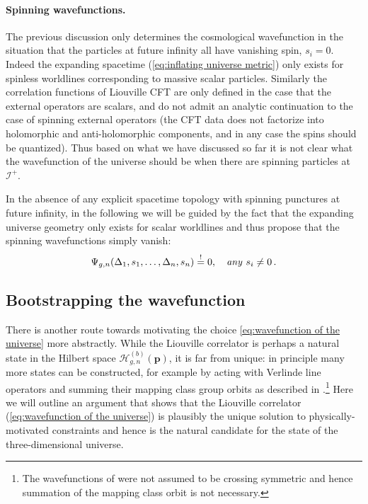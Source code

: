 \documentclass[12pt,a4paper]{article}
\begin{document}
\paragraph{Spinning wavefunctions.} 
The previous discussion only determines the cosmological wavefunction in the situation that the particles at future infinity all have vanishing spin, $s_i = 0$. 
Indeed the expanding spacetime (\ref{eq:inflating universe metric}) only exists for spinless worldlines corresponding to massive scalar particles. 
Similarly the correlation functions of Liouville CFT are only defined in the case that the external operators are scalars, and do not admit an analytic continuation to the case of spinning external operators (the CFT data does not factorize into holomorphic and anti-holomorphic components, and in any case the spins should be quantized). Thus based on what we have discussed so far it is not clear what the wavefunction of the universe should be when there are spinning particles at $\mathcal{I}^+$.

In the absence of any explicit spacetime topology with spinning punctures at future infinity, in the following we will be guided by the fact that the expanding universe geometry only exists for scalar worldlines and thus propose that the spinning wavefunctions simply vanish:
\begin{equation}\label{eq:spinning wavefunctions vanish}
    \Psi_{g,n}(\Delta_1,s_1,\ldots,\Delta_n,s_n) \stackrel{!}{=} 0,\quad \text{\emph{any} } s_i \ne 0\, .
\end{equation}

\subsection{Bootstrapping the wavefunction}
There is another route towards motivating the choice \eqref{eq:wavefunction of the universe} more abstractly.
While the Liouville correlator is perhaps a natural state in the Hilbert space $\mathcal{H}^{(b)}_{g,n}(\boldsymbol{p})$, it is far from unique: in principle many more states can be constructed, for example by acting with Verlinde line operators and summing their mapping class group orbits as described in \cite{Gaiotto:2024tpl}.\footnote{The wavefunctions of \cite{Gaiotto:2024tpl} were not assumed to be crossing symmetric and hence summation of the mapping class orbit is not necessary.} Here we will outline an argument that shows that the Liouville correlator (\ref{eq:wavefunction of the universe}) is plausibly the unique solution to physically-motivated constraints and hence is the natural candidate for the state of the three-dimensional universe. 
\end{document}

